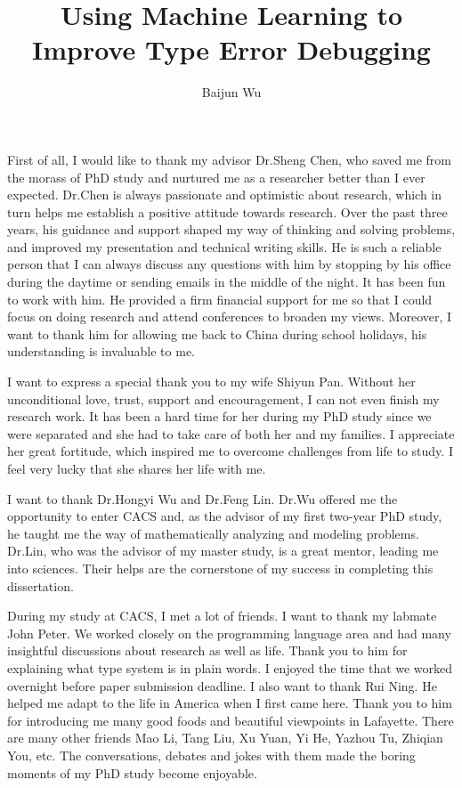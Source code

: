 \documentclass[12pt]{report}	%
\author{Baijun Wu}
\title{Using Machine Learning to Improve Type Error Debugging}
\begin{document}
\titlepage              %

\copyrightpage          %

\approvalpage           %

%
%
%

\begin{acknowledgments}		%

First of all, I would like to thank my advisor Dr.Sheng Chen, 
who saved me from the morass of PhD study and nurtured me as a researcher better than I ever expected.
%
Dr.Chen is always passionate and optimistic about research,
which in turn helps me establish a positive attitude towards research.
Over the past three years, his guidance and support shaped my way of thinking and solving problems,
and improved my presentation and technical writing skills.
%
He is such a reliable person that I can always discuss any questions with him 
by stopping by his office during the daytime or sending emails in the middle of the night.
It has been fun to work with him.
%
He provided a firm financial support for me 
so that I could focus on doing research and attend conferences to broaden my views.
Moreover, I want to thank him for allowing me back to China during school holidays,
his understanding is invaluable to me.

I want to express a special thank you to my wife Shiyun Pan.
Without her unconditional love, trust, support and encouragement,
I can not even finish my research work.
%
It has been a hard time for her during my PhD study since we were separated
and she had to take care of both her and my families.
I appreciate her great fortitude, which inspired me to overcome challenges from life to study. 
I feel very lucky that she shares her life with me.

I want to thank Dr.Hongyi Wu and Dr.Feng Lin.
Dr.Wu offered me the opportunity to enter CACS and,
as the advisor of my first two-year PhD study, 
he taught me the way of mathematically analyzing and modeling problems.
Dr.Lin, who was the advisor of my master study, is a great mentor, leading me into sciences.
Their helps are the cornerstone of my success in completing this dissertation.

During my study at CACS, I met a lot of friends. I want to thank my labmate John Peter.
We worked closely on the programming language area and had many insightful discussions about research as well as life.
Thank you to him for explaining what type system is in plain words.
I enjoyed the time that we worked overnight before paper submission deadline.
%
I also want to thank Rui Ning.
He helped me adapt to the life in America when I first came here.
Thank you to him for introducing me many good foods and beautiful viewpoints in Lafayette.
%
There are many other friends Mao Li, Tang Liu, Xu Yuan, Yi He, Yazhou Tu, Zhiqian You, etc.
The conversations, debates and jokes with them made the boring moments of my PhD study become enjoyable. 



\end{acknowledgments}
\end{document}

